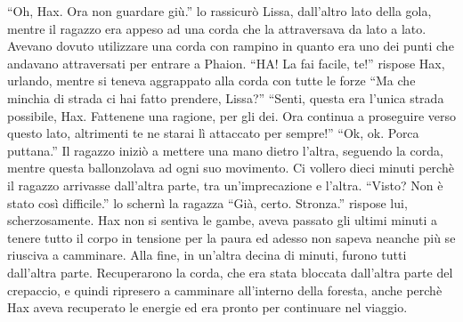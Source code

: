     ``Oh, Hax. Ora non guardare giù.'' lo rassicurò Lissa, dall'altro lato
    della gola, mentre il ragazzo era appeso ad una corda che la
    attraversava da lato a lato. Avevano dovuto utilizzare una corda con
    rampino in quanto era uno dei punti che andavano attraversati per
    entrare a Phaion. ``HA! La fai facile, te!'' rispose Hax, urlando,
    mentre si teneva aggrappato alla corda con tutte le forze ``Ma che
    minchia di strada ci hai fatto prendere, Lissa?'' ``Senti, questa era
    l'unica strada possibile, Hax. Fattenene una ragione, per gli dei. Ora
    continua a proseguire verso questo lato, altrimenti te ne starai lì
    attaccato per sempre!'' ``Ok, ok. Porca puttana.'' Il ragazzo iniziò a
    mettere una mano dietro l'altra, seguendo la corda, mentre questa
    ballonzolava ad ogni suo movimento. Ci vollero dieci minuti perchè il
    ragazzo arrivasse dall'altra parte, tra un'imprecazione e l'altra.
    ``Visto? Non è stato così difficile.'' lo schernì la ragazza ``Già,
    certo. Stronza.'' rispose lui, scherzosamente. Hax non si sentiva le
    gambe, aveva passato gli ultimi minuti a tenere tutto il corpo in
    tensione per la paura ed adesso non sapeva neanche più se riusciva a
    camminare. Alla fine, in un'altra
    decina di minuti, furono tutti dall'altra parte. Recuperarono la corda,
    che era stata bloccata dall'altra parte del crepaccio, e quindi
    ripresero a camminare all'interno della foresta, anche perchè Hax aveva
    recuperato le energie ed era pronto per continuare nel viaggio.


